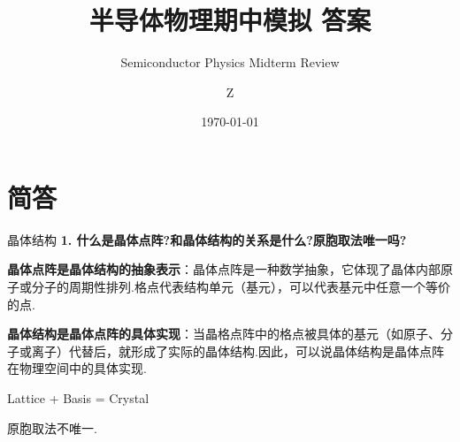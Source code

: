 \documentclass{beamer}
\author[Z]{Z}
\title{半导体物理期中模拟 \quad 答案}
\subtitle{Semiconductor Physics Midterm Review}
\institute[集成百川\; 同“芯”向前]{\large 集成百川\; 同“芯”向前\\njuic}
\date{\small \today}
\begin{document}


\begin{frame}
    \maketitle

\end{frame}


\section{简答}

\begin{frame}[t]{晶体结构}
    \textbf{1. 什么是晶体点阵?和晶体结构的关系是什么?原胞取法唯一吗?}\par
    \vspace{0.2cm}
    \textbf{晶体点阵是晶体结构的抽象表示}：晶体点阵是一种数学抽象，它体现了晶体内部原子或分子的周期性排列.格点代表结构单元（基元），可以代表基元中任意一个等价的点.\par
    \textbf{晶体结构是晶体点阵的具体实现}：当晶格点阵中的格点被具体的基元（如原子、分子或离子）代替后，就形成了实际的晶体结构.因此，可以说晶体结构是晶体点阵在物理空间中的具体实现.\par
    \vspace{0.1cm}
    Lattice  + Basis  =  Crystal\par
    \vspace{0.1cm}
    原胞取法不唯一.
\end{frame}
\end{document}
